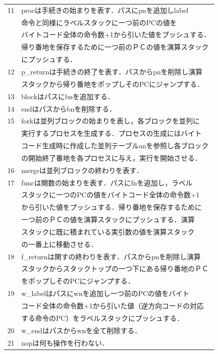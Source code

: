 \documentclass[submit,PRO]{ipsj}
\begin{document}
\begin{figure}[tb]
\begin{center}
\begin{tabular}[t]{|c|l|}
11& procは手続きの始まりを表す．パスにpnを追加しlabel\\ &命令と同様にラベルスタックに一つ前のPCの値を\\ &バイトコード全体の命令数+1から引いた値をプッシュする．\\ &帰り番地を保存するために一つ前のＰＣの値を演算スタック\\ &にプッシュする．\\\hline

12& p\_returnは手続きの終了を表す．パスからpnを削除し演算\\ &スタックから帰り番地をポップしそのPCにジャンプする．\\\hline

13& blockはパスにbnを追加する．\\\hline

14& endはパスからbnを削除する．\\\hline


15& forkは並列ブロックの始まりを表し，各ブロックを並列に\\ &実行するプロセスを生成する．プロセスの生成にはバイト\\ &コード生成時に作成した並列テーブルanを参照し各ブロック\\ &の開始終了番地を各プロセスに与え，実行を開始させる．\\\hline


16& mergeは並列ブロックの終わりを表す．\\\hline


17& funcは関数の始まりを表す．パスにfnを追加し，ラベル\\ &スタックに一つのPCの値をバイトコード全体の命令数+1\\ &から引いた値をプッシュする．帰り番地を保存するために\\ &一つ前のＰＣの値を演算スタックにプッシュする．演算\\ &スタックに既に積まれている実引数の値を演算スタック\\ &の一番上に移動させる．\\\hline


18& f\_returnは関すの終わりを表す．パスからpnを削除し演算\\ &スタックからスタックトップの一つ下にある帰り番地のＰＣ\\ &をポップしそのPCにジャンプする．\\\hline


19& w\_labelはパスにwnを追加し一つ前のPCの値をバイト\\ &コード全体の命令数+1から引いた値（逆方向コードの対応\\ &する命令のPC）をラベルスタックにプッシュする．\\\hline

20& w\_endはパスからwnを全て削除する．\\\hline

21& nopは何も操作を行わない． \\\hline
\end{tabular}
\end{center}
\end{figure}
\end{document}
